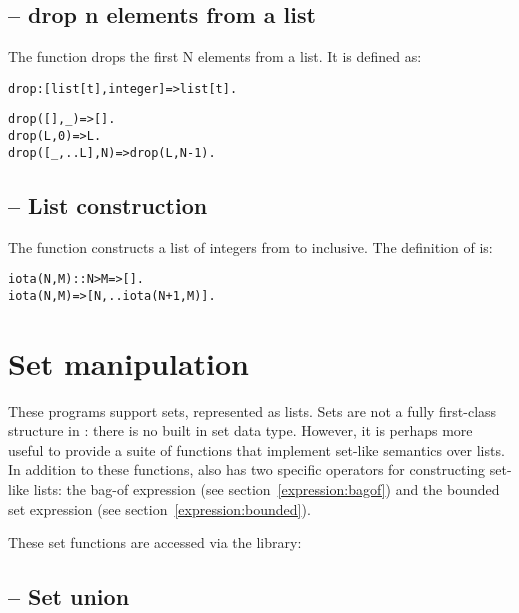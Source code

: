 \subsection{ -- drop n elements from a list}
\label{stdlib:drop}

The  function drops the first N elements from a list. It is defined as:
\begin{alltt}
drop:[list[t],integer]=>list[t].

drop([],_)=>[].
drop(L,0) => L.
drop([_,..L],N) => drop(L,N-1).
\end{alltt}


\subsection{ -- List construction}
\label{stdlib:iota}


The  function constructs a list of integers from  to  inclusive. The definition of  is:
\begin{alltt}
iota(N,M)::N>M=>[].
iota(N,M)=>[N,..iota(N+1,M)].
\end{alltt}

\section{Set manipulation}
These programs support sets, represented as lists. Sets are not a fully first-class structure in \go: there is no built in set data type. However, it is perhaps more useful to provide a suite of functions that implement set-like semantics over lists. In addition to these functions, \go also has two specific operators for constructing set-like lists: the bag-of expression (see section~\vref{expression:bagof}) and the bounded set expression (see section~\vref{expression:bounded}).

These set functions are accessed via the  library:


\subsection{\texorpdfstring{\function{\union} -- }{}Set union}
\label{stdlib:union}

